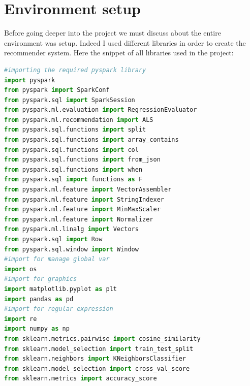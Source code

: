 \documentclass[12pt,english]{report}
\begin{document}
\chapter{Environment setup}\label{ch:environment}
Before going deeper into the project we must discuss about the entire environment was setup. Indeed I used different libraries in order to create the recommender system.
Here the snippet of all libraries used in the project:
\begin{lstlisting}[language={Python},label={lst:libraries},caption={Loading all the python libraries}]
#importing the required pyspark library
import pyspark
from pyspark import SparkConf
from pyspark.sql import SparkSession
from pyspark.ml.evaluation import RegressionEvaluator
from pyspark.ml.recommendation import ALS
from pyspark.sql.functions import split
from pyspark.sql.functions import array_contains
from pyspark.sql.functions import col
from pyspark.sql.functions import from_json
from pyspark.sql.functions import when
from pyspark.sql import functions as F
from pyspark.ml.feature import VectorAssembler
from pyspark.ml.feature import StringIndexer
from pyspark.ml.feature import MinMaxScaler
from pyspark.ml.feature import Normalizer
from pyspark.ml.linalg import Vectors
from pyspark.sql import Row
from pyspark.sql.window import Window
#import for manage global var
import os
#import for graphics
import matplotlib.pyplot as plt
import pandas as pd
#import for regular expression
import re
import numpy as np
from sklearn.metrics.pairwise import cosine_similarity
from sklearn.model_selection import train_test_split
from sklearn.neighbors import KNeighborsClassifier
from sklearn.model_selection import cross_val_score
from sklearn.metrics import accuracy_score
\end{lstlisting}
\end{document}
